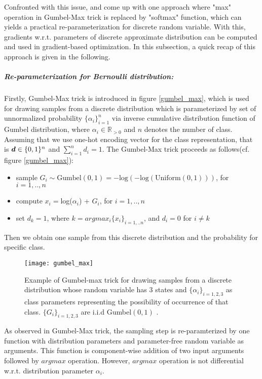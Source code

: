 Confronted with this issue, \cite{jang2016categorical} and \cite{maddison2016concrete} come up with one approach where "max" operation in Gumbel-Max trick is replaced by "softmax" function, which can yields a practical re-parameterization for discrete random variable. With this, gradients w.r.t. parameters of discrete approximate distribution can be computed and used in gradient-based optimization. In this subsection, a quick recap of this approach is given in the following.

\subparagraph{Re-parameterization for Bernoulli distribution:}
Firstly, Gumbel-Max trick\cite{maddison2014sampling} is introduced in figure \ref{gumbel_max}, which is used for drawing samples from a discrete distribution which is parameterized by set of unnormalized probability $\{\alpha_i\}_{i=1}^{n}$ via inverse cumulative distribution function of Gumbel distribution, where $\alpha_i \in \mathbb R_{>0}$ and $n$ denotes the number of class. Assuming that we use one-hot encoding vector for the class representation, that is $\boldsymbol d \in \{0,1\}^n $ and $\sum_{i=1}^{n}d_i = 1$. The Gumbel-Max trick proceeds as follows(cf. figure \ref{gumbel_max}):
\begin{itemize}
	\item sample $G_i \sim \text{Gumbel}(0,1) = -\text{log}(-\text{log}(\text{Uniform}(0,1)))$, for $i=1,..,n$
	\item compute $x_i = $log($\alpha_i$) + $G_i$, for $i=1,..,n$
	\item set $d_k = 1$, where $k=argmax_i\{x_i\}_{i=1,..n}$, and $d_i = 0$ for $i \neq k$
\end{itemize}
Then we obtain one sample from this discrete distribution and the probability for specific class.

\begin{figure}[h!]
	\begin{center} \label{gumbel_max}
		\texttt{[image: gumbel\_max]}
		\caption{Example of Gumbel-max trick for drawing samples from a discrete distribution whose random variable has 3 states and $\{\alpha_{i}\}_{i=1,2,3}$ as class parameters representing the possibility of occurrence of that class. $\{G_{i}\}_{i=1,2,3}$ are i.i.d Gumbel$(0,1)$ \cite{maddison2016concrete}.}		
		\label{fig:gumbel_max}
	\end{center}
\end{figure}

As observed in Gumbel-Max trick, the sampling step is re-paramterized by one function with distribution parameters and parameter-free random variable as arguments. This function is component-wise addition of two input arguments followed by $argmax$ operation. However, $argmax$ operation is not differential w.r.t. distribution parameter $\alpha_i$. 

